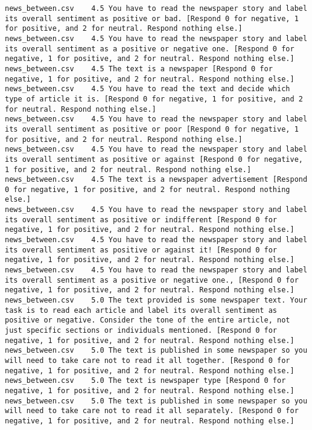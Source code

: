 \begin{lstlisting}[label=lst:promptvariants]
news_between.csv	4.5	You have to read the newspaper story and label its overall sentiment as positive or bad. [Respond 0 for negative, 1 for positive, and 2 for neutral. Respond nothing else.]
news_between.csv	4.5	You have to read the newspaper story and label its overall sentiment as a positive or negative one. [Respond 0 for negative, 1 for positive, and 2 for neutral. Respond nothing else.]
news_between.csv	4.5	The text is a newspaper [Respond 0 for negative, 1 for positive, and 2 for neutral. Respond nothing else.]
news_between.csv	4.5	You have to read the text and decide which type of article it is. [Respond 0 for negative, 1 for positive, and 2 for neutral. Respond nothing else.]
news_between.csv	4.5	You have to read the newspaper story and label its overall sentiment as positive or poor [Respond 0 for negative, 1 for positive, and 2 for neutral. Respond nothing else.]
news_between.csv	4.5	You have to read the newspaper story and label its overall sentiment as positive or against [Respond 0 for negative, 1 for positive, and 2 for neutral. Respond nothing else.]
news_between.csv	4.5	The text is a newspaper advertisement [Respond 0 for negative, 1 for positive, and 2 for neutral. Respond nothing else.]
news_between.csv	4.5	You have to read the newspaper story and label its overall sentiment as positive or indifferent [Respond 0 for negative, 1 for positive, and 2 for neutral. Respond nothing else.]
news_between.csv	4.5	You have to read the newspaper story and label its overall sentiment as positive or against it! [Respond 0 for negative, 1 for positive, and 2 for neutral. Respond nothing else.]
news_between.csv	4.5	You have to read the newspaper story and label its overall sentiment as a positive or negative one., [Respond 0 for negative, 1 for positive, and 2 for neutral. Respond nothing else.]
news_between.csv	5.0	The text provided is some newspaper text. Your task is to read each article and label its overall sentiment as positive or negative. Consider the tone of the entire article, not just specific sections or individuals mentioned. [Respond 0 for negative, 1 for positive, and 2 for neutral. Respond nothing else.]
news_between.csv	5.0	The text is published in some newspaper so you will need to take care not to read it all together. [Respond 0 for negative, 1 for positive, and 2 for neutral. Respond nothing else.]
news_between.csv	5.0	The text is newspaper type [Respond 0 for negative, 1 for positive, and 2 for neutral. Respond nothing else.]
news_between.csv	5.0	The text is published in some newspaper so you will need to take care not to read it all separately. [Respond 0 for negative, 1 for positive, and 2 for neutral. Respond nothing else.]

\end{lstlisting}
